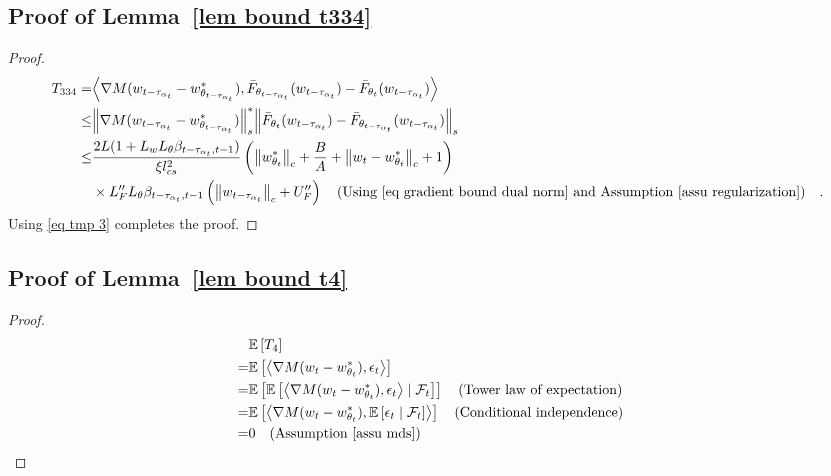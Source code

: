 \documentclass[twoside,11pt]{article}
\newcommand{\fF}{\mathcal{F}}
\newcommand{\E}{\mathbb{E}}
\newcommand{\indot}[2]{{\left<#1, #2\right>}}
\numberwithin{assucounter}{section}
\begin{document}
\subsection{Proof of Lemma~\ref{lem bound t334}}
\label{sec proof lem bound t334}
\lemboundtthreethreefour*
\begin{proof}
  \begin{align}
      T_{334} = &\indot{\nabla M(w_{t-\tau_{\alpha_t}} - w^*_{\theta_{t-\tau_{\alpha_t}}})}{\bar F_{\theta_{t - \tau_{\alpha_t}}}(w_{t- \tau_{\alpha_t}}) - \bar F_{\theta_{t}}(w_{t- \tau_{\alpha_t}})}  \\
      \leq &\norm{\nabla M(w_{t-\tau_{\alpha_t}} - w^*_{\theta_{t-\tau_{\alpha_t}}})}_s^* \norm{\bar F_{\theta_{t}}(w_{t- \tau_{\alpha_t}}) - \bar F_{\theta_{t - \tau_{\alpha_t}}}(w_{t- \tau_{\alpha_t}})}_s  \\
      \leq & \frac{2L(1 + L_wL_\theta \beta_{t-\tau_{\alpha_t}, t-1})}{\xi l_{cs}^2}\left(\norm{w^*_{\theta_t}}_c + \frac{B}{A} + \norm{w_t - w^*_{\theta_t}}_c + 1\right) \\
      &\times L_F'' L_\theta \beta_{t-\tau_{\alpha_t}, t-1} \left(\norm{w_{t-\tau_{\alpha_t}}}_c + U_F''\right) \qq{(Using \eqref{eq gradient bound dual norm} and Assumption \ref{assu regularization})}.
  \end{align}
  Using \eqref{eq tmp 3} completes the proof.
\end{proof}

\subsection{Proof of Lemma~\ref{lem bound t4}}
\label{sec proof lem bound t4}
\lemboundtfour*
\begin{proof}
  \begin{align}
    &\E\left[T_4\right] \\
    =& \E\left[\indot{\nabla M(w_t - w^*_{\theta_t})}{\epsilon_t} \right] \\
    =& \E\left[\E\left[\indot{\nabla M(w_t - w^*_{\theta_t})}{\epsilon_t} \mid \fF_t \right] \right] \qq{(Tower law of expectation)} \\
    =& \E\left[\indot{\nabla M(w_t - w^*_{\theta_t})}{\E\left[\epsilon_t \mid \fF_t \right]} \right] \qq{(Conditional independence)} \\
    =&0\qq{(Assumption~\ref{assu mds})}
  \end{align}
\end{proof}
\end{document}
